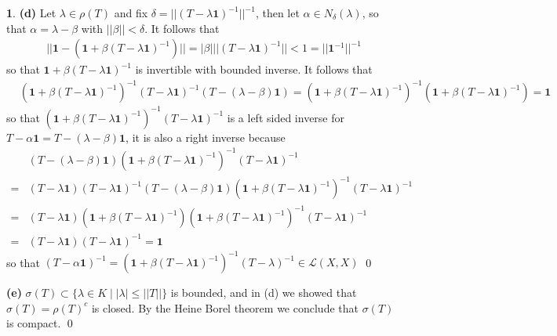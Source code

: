 \documentclass[11pt]{article}
\theoremstyle{definition}
\newtheorem{pb}{}
\newcommand{\set}[1]{\{#1\}}
\newcommand{\abs}[1]{\left\vert#1\right\vert}
\newcommand{\norm}[1]{\lvert\lvert#1\rvert\rvert}
\begin{document}
\begin{pb}
        \textbf{(d)} Let \(\lambda \in \rho(T)\) and fix \(\delta = \norm{(T - \lambda \mathbf{1})^{-1}}^{-1}\), then let \(\alpha \in N_\delta(\lambda)\), so that \(\alpha = \lambda - \beta\) with \(\norm{\beta} < \delta\). It follows that
        \begin{align*}
            \norm{\mathbf{1} - (\mathbf{1} + \beta(T - \lambda\mathbf{1})^{-1})} = \abs{\beta}\norm{(T - \lambda\mathbf{1})^{-1}} < 1 = \norm{\mathbf{1}^{-1}}^{-1}
        \end{align*}
        so that \(\mathbf{1} + \beta(T - \lambda\mathbf{1})^{-1}\) is invertible with bounded inverse. It follows that
        \begin{align*}
            &(\mathbf{1} + \beta(T - \lambda\mathbf{1})^{-1})^{-1}(T - \lambda \mathbf{1})^{-1}(T-(\lambda - \beta)\mathbf{1}) = (\mathbf{1} + \beta(T - \lambda\mathbf{1})^{-1})^{-1}(\mathbf{1} + \beta(T - \lambda \mathbf{1})^{-1}) = \mathbf{1}
        \end{align*}
        so that \((\mathbf{1} + \beta(T - \lambda\mathbf{1})^{-1})^{-1}(T - \lambda \mathbf{1})^{-1}\) is a left sided inverse for \(T - \alpha \mathbf{1} = T - (\lambda - \beta)\mathbf{1}\), it is also a right inverse because
        \begin{align*}
            &(T-(\lambda - \beta)\mathbf{1})(\mathbf{1} + \beta(T - \lambda\mathbf{1})^{-1})^{-1}(T - \lambda \mathbf{1})^{-1} \\
            = &(T - \lambda \mathbf{1})(T - \lambda \mathbf{1})^{-1}(T-(\lambda - \beta)\mathbf{1})(\mathbf{1} + \beta(T - \lambda\mathbf{1})^{-1})^{-1}(T - \lambda \mathbf{1})^{-1} \\
            = &(T - \lambda \mathbf{1})(\mathbf{1} + \beta(T - \lambda\mathbf{1})^{-1})(\mathbf{1} + \beta(T - \lambda\mathbf{1})^{-1})^{-1}(T-\lambda \mathbf{1})^{-1} \\
            = &(T - \lambda \mathbf{1})(T - \lambda \mathbf{1})^{-1} = \mathbf{1}
        \end{align*}
        so that \((T - \alpha \mathbf{1})^{-1} = (\mathbf{1} + \beta(T - \lambda\mathbf{1})^{-1})^{-1}(T - \lambda)^{-1} \in \mathcal{L}(X,X)\) \qed

        \textbf{(e)} \(\sigma(T) \subset \set{\lambda \in K \mid \abs{\lambda} \leq \norm{T}}\) is bounded, and in (d) we showed that \(\sigma(T) = \rho(T)^c\) is closed. By the Heine Borel theorem we conclude that \(\sigma(T)\) is compact. \qed
    \end{pb}
\end{document}
